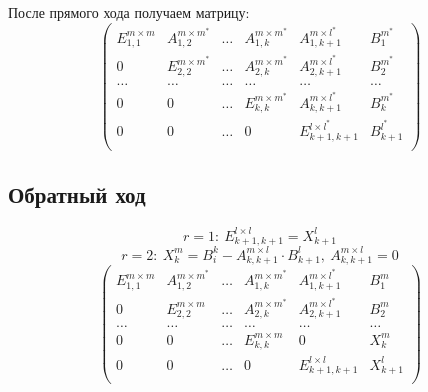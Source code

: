 \documentclass[12pt]{report}
\begin{document}
            После прямого хода получаем матрицу:
            \[
            \left(
            \begin{array}{ccccc|c}
                E_{1,1}^{m \times m} & A_{1,2}^{m \times m^*} & \ldots & A_{1,k}^{m \times m^*} & A_{1,k+1}^{m \times l^*}    & B^{m^*}_{1}   \\  
                0                    & E_{2,2}^{m \times m^*} & \ldots & A_{2,k}^{m \times m^*} & A_{2,k+1}^{m \times l^*}    & B^{m^*}_{2}   \\  
                \ldots               & \ldots                 & \ldots & \ldots                 & \ldots                      & \ldots        \\  
                0                    & 0                      & \ldots & E_{k,k}^{m \times m^*} & A_{k,k+1}^{m \times l^*}    & B^{m^*}_{k}   \\  
                0                    & 0                      & \ldots & 0                      & E_{k+1, k+1}^{l \times l^*} & B^{l^*}_{k+1} \\  
            \end{array} 
            \right)
            \]

        \subsection{Обратный ход}
        
        \[r = 1: \ E_{k + 1, k + 1}^{l \times l} = X_{k+1}^{l}\]    
        \[r = 2: \ X_{k}^{m} = B_{i}^{k} - A^{m \times l}_{k,k+1} \cdot B^{l}_{k+1},\ A^{m \times l}_{k,k+1} = 0 \]
        \[
        \left(
        \begin{array}{ccccc|c}
            E_{1,1}^{m \times m} & A_{1,2}^{m \times m^*} & \ldots & A_{1,k}^{m \times m^*} & A_{1,k+1}^{m \times l^*}  & B^{m}_{1}   \\  
            0                    & E_{2,2}^{m \times m}   & \ldots & A_{2,k}^{m \times m^*} & A_{2,k+1}^{m \times l^*}  & B^{m}_{2}   \\  
            \ldots               & \ldots                 & \ldots & \ldots                 & \ldots                    & \ldots      \\  
            0                    & 0                      & \ldots & E_{k,k}^{m \times m}   & 0                         & X^{m}_{k}   \\  
            0                    & 0                      & \ldots & 0                      & E_{k+1, k+1}^{l \times l} & X^{l}_{k+1} \\  
        \end{array}
        \right)
        \]
\end{document}

